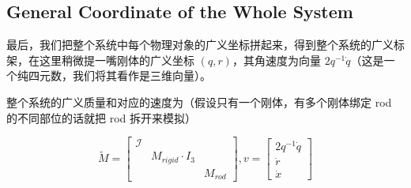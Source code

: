 \documentclass{notes}
\begin{document}
\subsection{General Coordinate of the Whole System}

最后，我们把整个系统中每个物理对象的广义坐标拼起来，得到整个系统的广义标架，在这里稍微提一嘴刚体的广义坐标 $(q, r)$，其角速度为向量 $2q ^{-1} \dot{q}$（这是一个纯四元数，我们将其看作是三维向量）。

整个系统的广义质量和对应的速度为（假设只有一个刚体，有多个刚体绑定 rod 的不同部位的话就把 rod 拆开来模拟）

\begin{equation}
	\tilde{M} = \begin{bmatrix}
		\mathcal{I} \\
		& M_{rigid} \cdot I_3 \\
		& &M_{rod}
	\end{bmatrix},
	v = \begin{bmatrix}
		2q ^{-1} \dot{q} \\
		\dot{r} \\
		\dot{x}
	\end{bmatrix}
\end{equation}
\end{document}
